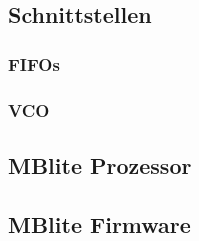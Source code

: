  
\subsection{Schnittstellen}



\subsubsection{FIFOs}

\label{ImplMemoryMapTrackingloop}
\subsubsection{VCO}\label{VCOimplementierung}

\subsection{MBlite Prozessor}
\subsection{MBlite Firmware}